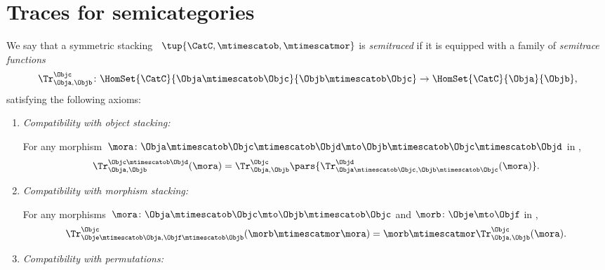 
\section{Traces for semicategories}

\begin{ctdefinition}
    \label{def:semitraced-assoc-stack-scat}
    We say that a symmetric stacking ~$\tup{\CatC, \mtimescatob, \mtimescatmor}$ is \emph{semitraced} if it is equipped with a family of \emph{semitrace functions}
    \begin{equation}
        \Tr_{\Obja,\Objb}^\Objc\colon \HomSet{\CatC}{\Obja \mtimescatob \Objc}{\Objb\mtimescatob \Objc}\to \HomSet{\CatC}{\Obja}{\Objb},
    \end{equation}
    satisfying the following axioms:
    \begin{enumerate}

        \item \emph{Compatibility with object stacking:}

              For any morphism~$\mora \colon \Obja\mtimescatob \Objc \mtimescatob \Objd \mto \Objb\mtimescatob \Objc \mtimescatob \Objd$ in \CatC,
              \begin{equation}
                  \label{eq:semicat-semitrace-vanishing_2}
                  \Tr_{\Obja,\Objb}^{\Objc\mtimescatob \Objd}(\mora)=\Tr_{\Obja,\Objb}^\Objc\pars{
                      \Tr_{\Obja \mtimescatob \Objc, \Objb \mtimescatob \Objc}^\Objd(\mora)}.
              \end{equation}

        \item \emph{Compatibility with morphism stacking:}

              For any morphisms~$\mora\colon \Obja\mtimescatob \Objc \mto \Objb\mtimescatob \Objc$ and $\morb \colon \Obje \mto \Objf$ in \CatC,
              \begin{equation}
                  \label{eq:semicat-semitrace-superposing}
                  \Tr_{\Obje\mtimescatob \Obja,\Objf\mtimescatob \Objb}^{\Objc}(\morb \mtimescatmor \mora)=\morb \mtimescatmor \Tr_{\Obja,\Objb}^\Objc(\mora).
              \end{equation}

        \item \emph{Compatibility with permutations:}


    \end{enumerate}
\end{ctdefinition}

